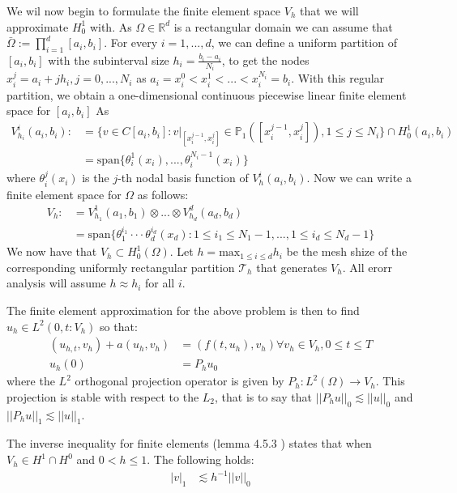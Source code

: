 We wil now begin to formulate the finite element space $V_h$ that we will approximate $H^1_0$ with.
As $\Omega \in \mathbb{R}^d$ is a rectangular domain we can assume that $\bar \Omega := \prod^d_{i=1}[a_i,b_i]$.
For every $i = 1,...,d$, we can define a uniform partition of $[a_i,b_i]$ with the subinterval size $h_i = \frac{b_i - a_i}{N_i}$,
to get the nodes $x^j_i = a_i + jh_i, j = 0,...,N_i$ as $a_i = x_i^0 < x_i^1 < ... < x_i^{N_i} = b_i$.
With this regular partition, we obtain a one-dimensional continuous piecewise linear finite element space for $[a_i,b_i]$ As
\begin{align*}
    V^i_{h_i}(a_i,b_i) :&= \{v\in C[a_i,b_i]: v|_{[x^{j-1}_i, x^j_i]}\in\mathbb{P}_1([x_i^{j-1},x_i^j]),1\leq j \leq N_i\} \cap H^1_0(a_i,b_i)\\
    &=\text{span}\{\theta^1_i(x_i), ... , \theta^{N_i-1}_i(x_i)\} 
\end{align*}
where $\theta^j_i(x_i)$ is the $j$-th nodal basis function of $V_h^i(a_i,b_i)$. 
Now we can write a finite element space for $\Omega$ as follows:
\begin{align*}
    V_h :&= V_{h_1}^1(a_1,b_1) \otimes ... \otimes V^d_{h_d}(a_d,b_d)\\
    &= \text{span}\{\theta_1^{i_1}\cdot \cdot \cdot \theta_d^{i_d}(x_d): 1 \leq i_1 \leq N_1-1,...,1\leq i_d \leq N_d-1\}
\end{align*}
We now have that $V_h\subset H^1_0(\Omega)$.
Let $h=\text{max}_{1\leq i\leq d}h_i$ be the mesh shize of the corresponding uniformly rectangular partition $\mathcal{T}_h$ that generates $V_h$.
All erorr analysis will assume $h\approx h_i$ for all $i$.

The finite element approximation for the above problem is then to find $u_h \in L^2(0,t:V_h)$ so that:
\begin{align*}
    (u_{h,t},v_h) + a(u_h,v_h) &=(f(t,u_h),v_h) \forall v_h \in V_h, 0\leq t \leq T\\
    u_h(0) &= P_hu_0
\end{align*}
where the $L^2$ orthogonal projection operator is given by $P_h:L^2(\Omega) \rightarrow V_h$.
This projection is stable with respect to the $L_2$, that is to say that $||P_hu||_0 \lesssim ||u||_0$ and $||P_hu||_1 \lesssim ||u||_1$.

The inverse inequality for finite elements (lemma 4.5.3 \cite{Brenner2008}) states that when $V_h \in H^1 \cap H^0$ and $0 < h \leq 1$.
The following holds:
\begin{align*}
    |v|_1 &\lesssim h^{-1} ||v||_0
\end{align*}

